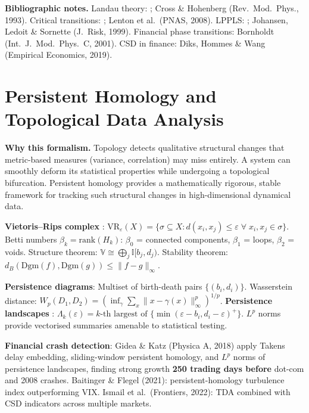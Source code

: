\documentclass[11pt,a4paper]{article}
\theoremstyle{definition}
\begin{document}
\begin{appendices}
\textbf{Bibliographic notes.} Landau theory: \citet{landau1937theory}; Cross \& Hohenberg (Rev.\ Mod.\ Phys., 1993). Critical transitions: \citet{scheffer2009early,dakos2012methods}; Lenton et al.\ (PNAS, 2008). LPPLS: \citet{sornette2003critical}; Johansen, Ledoit \& Sornette (J.\ Risk, 1999). Financial phase transitions: Bornholdt (Int.\ J.\ Mod.\ Phys.\ C, 2001). CSD in finance: Diks, Hommes \& Wang (Empirical Economics, 2019).


\section{Persistent Homology and Topological Data Analysis}
\label{app:tda}

\textbf{Why this formalism.} Topology detects qualitative structural changes that metric-based measures (variance, correlation) may miss entirely. A system can smoothly deform its statistical properties while undergoing a topological bifurcation. Persistent homology provides a mathematically rigorous, stable framework for tracking such structural changes in high-dimensional dynamical data.

\textbf{Vietoris--Rips complex} \citep{edelsbrunner2010computational}: $\mathrm{VR}_\varepsilon(X) = \{\sigma \subseteq X : d(x_i,x_j) \leq \varepsilon\;\forall\; x_i,x_j \in \sigma\}$. Betti numbers $\beta_k = \mathrm{rank}(H_k)$: $\beta_0$ = connected components, $\beta_1$ = loops, $\beta_2$ = voids. Structure theorem: $\mathbb{V} \cong \bigoplus_j \mathbb{I}[b_j, d_j)$. Stability theorem: $d_B(\mathrm{Dgm}(f), \mathrm{Dgm}(g)) \leq \|f-g\|_\infty$.

\textbf{Persistence diagrams}: Multiset of birth-death pairs $\{(b_i, d_i)\}$. Wasserstein distance: $W_p(D_1,D_2) = (\inf_\gamma \sum_x \|x-\gamma(x)\|_\infty^p)^{1/p}$. \textbf{Persistence landscapes} \citep{bubenik2015statistical}: $\Lambda_k(\varepsilon) = k\text{-th largest of } \{\min(\varepsilon-b_i, d_i-\varepsilon)^+\}$. $L^p$ norms provide vectorised summaries amenable to statistical testing.

\textbf{Financial crash detection}: Gidea \& Katz (Physica A, 2018) apply Takens delay embedding, sliding-window persistent homology, and $L^p$ norms of persistence landscapes, finding strong growth \textbf{250 trading days before} dot-com and 2008 crashes. Baitinger \& Flegel (2021): persistent-homology turbulence index outperforming VIX. Ismail et al.\ (Frontiers, 2022): TDA combined with CSD indicators across multiple markets.


\end{appendices}
\end{document}

